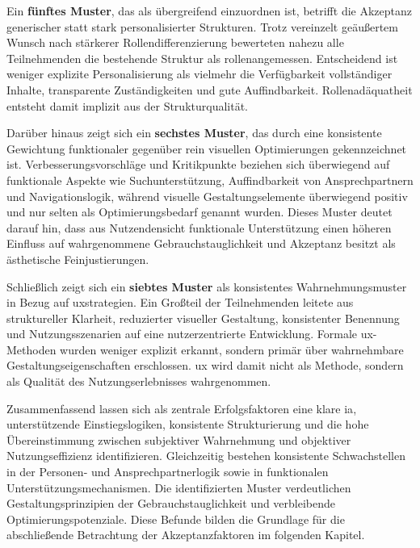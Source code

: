 Ein \textbf{fünftes Muster}, das als übergreifend einzuordnen ist, betrifft die Akzeptanz generischer statt stark personalisierter Strukturen. Trotz vereinzelt geäußertem Wunsch nach stärkerer Rollendifferenzierung bewerteten nahezu alle Teilnehmenden die bestehende Struktur als rollenangemessen. Entscheidend ist weniger explizite Personalisierung als vielmehr die Verfügbarkeit vollständiger Inhalte, transparente Zuständigkeiten und gute Auffindbarkeit. Rollenadäquatheit entsteht damit implizit aus der Strukturqualität.

Darüber hinaus zeigt sich ein \textbf{sechstes Muster}, das durch eine konsistente Gewichtung funktionaler gegenüber rein visuellen Optimierungen gekennzeichnet ist. Verbesserungsvorschläge und Kritikpunkte beziehen sich überwiegend auf funktionale Aspekte wie Suchunterstützung, Auffindbarkeit von Ansprechpartnern und Navigationslogik, während visuelle Gestaltungselemente überwiegend positiv und nur selten als Optimierungsbedarf genannt wurden. Dieses Muster deutet darauf hin, dass aus Nutzendensicht funktionale Unterstützung einen höheren Einfluss auf wahrgenommene Gebrauchstauglichkeit und Akzeptanz besitzt als ästhetische Feinjustierungen.

Schließlich zeigt sich ein \textbf{siebtes Muster} als konsistentes Wahrnehmungsmuster in Bezug auf \Gls{uxstrategien}. Ein Großteil der Teilnehmenden leitete aus struktureller Klarheit, reduzierter visueller Gestaltung, konsistenter Benennung und Nutzungsszenarien auf eine nutzerzentrierte Entwicklung. Formale \Gls{ux}-Methoden wurden weniger explizit erkannt, sondern primär über wahrnehmbare Gestaltungseigenschaften erschlossen. \Gls{ux} wird damit nicht als Methode, sondern als Qualität des Nutzungserlebnisses wahrgenommen.

Zusammenfassend lassen sich als zentrale Erfolgsfaktoren eine klare \Gls{ia}, unterstützende Einstiegslogiken, konsistente Strukturierung und die hohe Übereinstimmung zwischen subjektiver Wahrnehmung und objektiver Nutzungseffizienz identifizieren. Gleichzeitig bestehen konsistente Schwachstellen in der Personen- und Ansprechpartnerlogik sowie in funktionalen Unterstützungsmechanismen. Die identifizierten Muster verdeutlichen Gestaltungsprinzipien der Gebrauchstauglichkeit und verbleibende Optimierungspotenziale. Diese Befunde bilden die Grundlage für die abschließende Betrachtung der Akzeptanzfaktoren im folgenden Kapitel.

